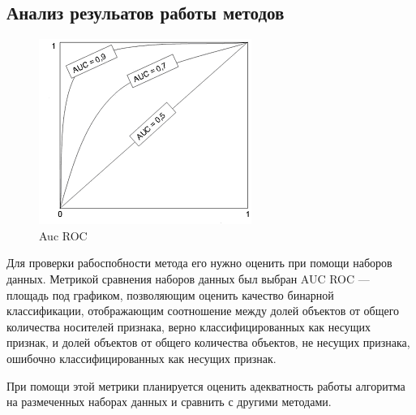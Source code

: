 \subsection{Анализ резульатов работы методов}
\begin{figure}[!h]
	\centering
	\includegraphics[width=.5\textwidth]{img/aucROc.png}
	\caption{Auc ROC}
	\label{fig06}
\end{figure}
Для проверки рабоспобности метода его нужно оценить при помощи наборов данных. Метрикой сравнения наборов данных был выбран AUC ROC — площадь под графиком, позволяющим оценить качество бинарной классификации, отображающим соотношение между долей объектов от общего количества носителей признака, верно классифицированных как несущих признак, и долей объектов от общего количества объектов, не несущих признака, ошибочно классифицированных как несущих признак. 

При помощи этой метрики планируется оценить адекватность работы алгоритма на размеченных наборах данных и  сравнить  с другими методами.

